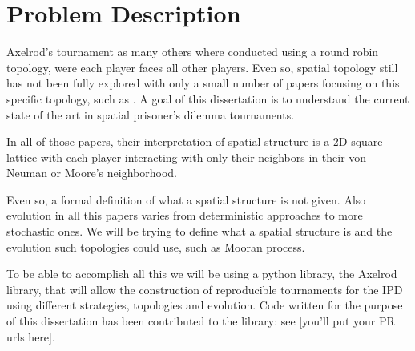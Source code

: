 \section{Problem Description}

Axelrod's tournament as many others where conducted using a round robin
topology, were each player faces all other players. Even so, spatial topology
still has not been fully explored with only a small number of papers focusing on
this specific topology, such as \parencite{Nowak_&_May1993,
Brauchli_&_Killingback_&_Doebelis1999, Meng&Xia_etc2015,
Lindgren_&_Nordahl1994}. A goal of this dissertation is to understand the
current state of the art in spatial prisoner’s dilemma tournaments.

In all of those papers, their interpretation of spatial structure is a 2D square
lattice with each player interacting with only their neighbors in their von
Neuman or Moore's neighborhood.


Even so, a formal definition of what a spatial
structure is not given. Also evolution in all this papers varies from
deterministic approaches to more stochastic ones. We will be trying to define
what a spatial structure is and the evolution such topologies could use, such as
Mooran process.

To be able to accomplish all this we will be using a python library, the Axelrod
library, that will allow the construction of reproducible tournaments for the
IPD using different strategies, topologies and evolution. Code written for the
purpose of this dissertation has been contributed to the library: see [you'll
put your PR urls here].

